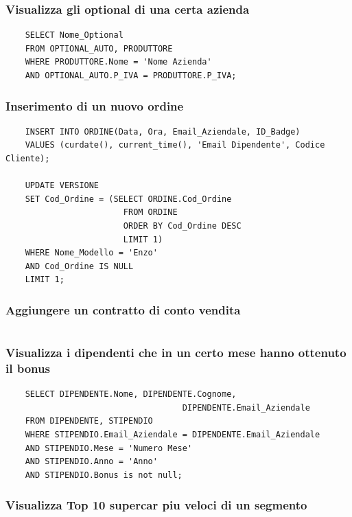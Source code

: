 \documentclass[11pt]{article}
\begin{document}
\subsubsection*{Visualizza gli optional di una certa azienda}
\begin{lstlisting}
    SELECT Nome_Optional
    FROM OPTIONAL_AUTO, PRODUTTORE
    WHERE PRODUTTORE.Nome = 'Nome Azienda'
    AND OPTIONAL_AUTO.P_IVA = PRODUTTORE.P_IVA;
\end{lstlisting}

\subsubsection*{Inserimento di un nuovo ordine}
\begin{lstlisting}
    INSERT INTO ORDINE(Data, Ora, Email_Aziendale, ID_Badge) 
    VALUES (curdate(), current_time(), 'Email Dipendente', Codice Cliente);

    UPDATE VERSIONE
    SET Cod_Ordine = (SELECT ORDINE.Cod_Ordine
                        FROM ORDINE
                        ORDER BY Cod_Ordine DESC
                        LIMIT 1)
    WHERE Nome_Modello = 'Enzo'
    AND Cod_Ordine IS NULL
    LIMIT 1;
\end{lstlisting}

\subsubsection*{Aggiungere un contratto di conto vendita}
\begin{lstlisting}

\end{lstlisting}

\subsubsection*{Visualizza i dipendenti che in un certo mese hanno ottenuto il
bonus}

\begin{lstlisting}
    SELECT DIPENDENTE.Nome, DIPENDENTE.Cognome, 
                                    DIPENDENTE.Email_Aziendale 
    FROM DIPENDENTE, STIPENDIO
    WHERE STIPENDIO.Email_Aziendale = DIPENDENTE.Email_Aziendale
    AND STIPENDIO.Mese = 'Numero Mese'
    AND STIPENDIO.Anno = 'Anno'
    AND STIPENDIO.Bonus is not null;
\end{lstlisting}

\subsubsection*{Visualizza Top 10 supercar piu veloci di un segmento}
\end{document}
